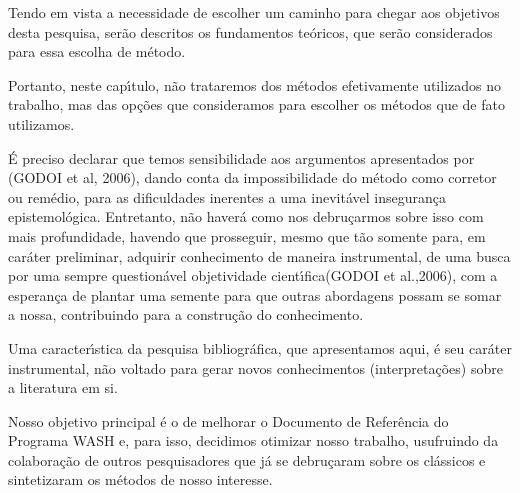 \documentclass[
12pt,		%
openright,	%
twoside,  %
a4paper,			%
chapter=TITLE,		%
english,			%
french,				%
spanish,			%
brazil				%
]{USPSC-classe/USPSC}
\begin{document}
Tendo em vista a necessidade de escolher um caminho para chegar  aos objetivos desta pesquisa, ser\~ao descritos os fundamentos te\'oricos, que ser\~ao considerados para essa escolha de m\'etodo.









Portanto, neste cap\'{\i}tulo, n\~ao trataremos dos m\'etodos efetivamente utilizados no trabalho, mas das op\c{c}\~oes que consideramos para escolher os m\'etodos que de fato utilizamos.









\'E preciso declarar que temos sensibilidade aos argumentos apresentados por (GODOI et al, 2006), dando conta da impossibilidade \textquotedbl  do m\'etodo como corretor ou rem\'edio, para as dificuldades \textquotedbl inerentes a uma inevit\'avel inseguran\c{c}a epistemol\'ogica\textquotedbl . Entretanto, n\~ao haver\'a como nos debru\c{c}armos sobre isso com mais profundidade, havendo que prosseguir, mesmo que t\~ao somente para, em car\'ater preliminar, \textquotedbl adquirir conhecimento de maneira instrumental\textquotedbl , de uma busca por uma sempre question\'avel \textquotedbl objetividade cient\'{\i}fica\textquotedbl  (GODOI et al.,2006), com a esperan\c{c}a de plantar uma semente para que outras abordagens possam se somar a nossa, contribuindo para a constru\c{c}\~ao do conhecimento.









Uma caracter\'{\i}stica da pesquisa bibliogr\'afica, que apresentamos aqui, \'e seu  car\'ater instrumental, n\~ao voltado para gerar novos conhecimentos (interpreta\c{c}\~oes) sobre a literatura em si.









Nosso objetivo principal \'e o de melhorar o Documento de Refer\^encia do Programa WASH e, para isso, decidimos otimizar nosso trabalho, usufruindo da colabora\c{c}\~ao de outros pesquisadores que j\'a se debru\c{c}aram sobre os cl\'assicos e  sintetizaram os m\'etodos de nosso interesse.
\end{document}
